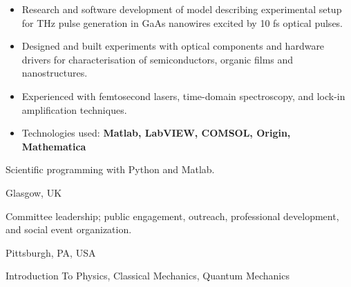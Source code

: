 \documentclass[10pt,a4paper,ragged2e,withhyper]{altacv}
\begin{document}
\begin{paracol}{2}
\begin{itemize}
    \item Research and software development of model describing experimental
    setup for THz pulse generation in GaAs nanowires excited by 10 fs
    optical pulses.

    \item Designed and built experiments with optical components and hardware
    drivers for characterisation of semiconductors, organic films and
    nanostructures.
    
    \item Experienced with femtosecond lasers, time-domain spectroscopy, and
    lock-in amplification techniques.

    \item Technologies used:
    {\bf Matlab, LabVIEW, COMSOL, Origin, Mathematica}
\end{itemize}



Scientific programming with Python and Matlab.

\divider

{Glasgow, UK}

Committee leadership;
public engagement, outreach, professional development, and social event
organization.


\divider

{Pittsburgh, PA, USA}

Introduction To Physics, Classical Mechanics, Quantum Mechanics




\end{paracol}
\end{document}
